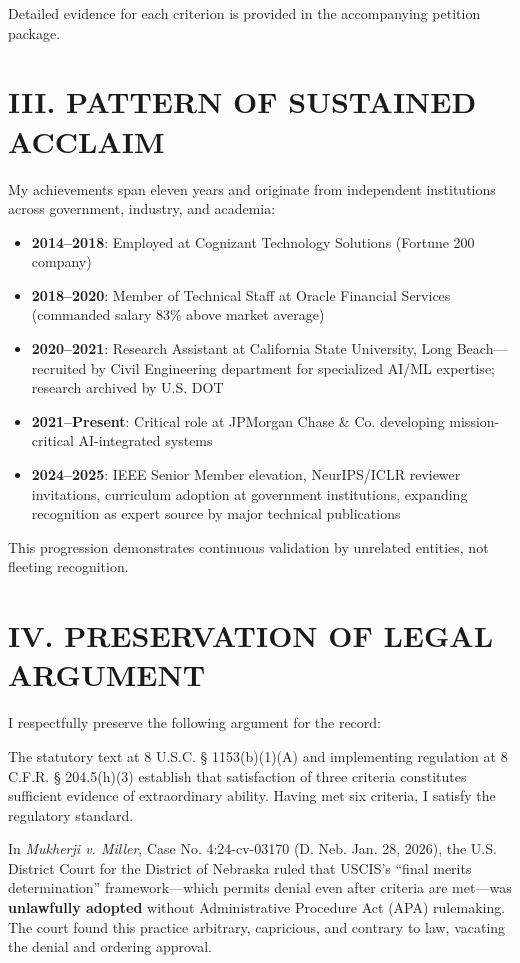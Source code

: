 \documentclass[11pt]{article}
\begin{document}
Detailed evidence for each criterion is provided in the accompanying petition package.

\section*{III. PATTERN OF SUSTAINED ACCLAIM}

My achievements span eleven years and originate from independent institutions across government, industry, and academia:

\begin{itemize}
    \item \textbf{2014--2018}: Employed at Cognizant Technology Solutions (Fortune 200 company)
    \item \textbf{2018--2020}: Member of Technical Staff at Oracle Financial Services (commanded salary 83\% above market average)
    \item \textbf{2020--2021}: Research Assistant at California State University, Long Beach—recruited by Civil Engineering department for specialized AI/ML expertise; research archived by U.S. DOT
    \item \textbf{2021--Present}: Critical role at JPMorgan Chase \& Co. developing mission-critical AI-integrated systems
    \item \textbf{2024--2025}: IEEE Senior Member elevation, NeurIPS/ICLR reviewer invitations, curriculum adoption at government institutions, expanding recognition as expert source by major technical publications
\end{itemize}

This progression demonstrates continuous validation by unrelated entities, not fleeting recognition.

\section*{IV. PRESERVATION OF LEGAL ARGUMENT}

I respectfully preserve the following argument for the record:

The statutory text at 8 U.S.C. § 1153(b)(1)(A) and implementing regulation at 8 C.F.R. § 204.5(h)(3) establish that satisfaction of three criteria constitutes sufficient evidence of extraordinary ability. Having met six criteria, I satisfy the regulatory standard.

In \textit{Mukherji v. Miller}, Case No. 4:24-cv-03170 (D. Neb. Jan. 28, 2026), the U.S. District Court for the District of Nebraska ruled that USCIS's ``final merits determination'' framework—which permits denial even after criteria are met—was \textbf{unlawfully adopted} without Administrative Procedure Act (APA) rulemaking. The court found this practice arbitrary, capricious, and contrary to law, vacating the denial and ordering approval.
\end{document}
